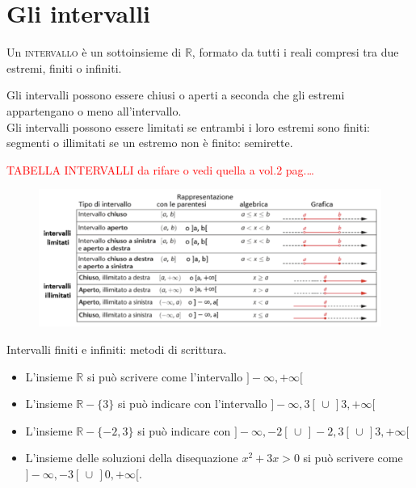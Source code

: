 \section{Gli intervalli}
  \begin{definizione}
Un \textsc{intervallo} è un sottoinsieme di $\mathbb{R}$, formato da tutti i 
reali compresi tra due estremi, finiti o infiniti.\\
\end{definizione}

Gli intervalli possono essere chiusi o aperti a seconda che gli estremi 
appartengano o meno all'intervallo.\\
Gli intervalli possono essere limitati se entrambi i loro estremi sono 
finiti: segmenti o illimitati se un estremo non è finito: semirette.

\textcolor{red}{TABELLA INTERVALLI da rifare o vedi quella a vol.2 pag.\dots}
\begin{figure}[htpb!]
  \centering
  \includegraphics[width=1\textwidth]{img/top_tab.png}%
\end{figure}




\begin{esempio} Intervalli finiti e infiniti: metodi di scrittura.
  \begin{itemize}
  \item[a)] L'insieme $\mathbb{R}$ si può scrivere come 
l'intervallo $]-\infty, +\infty[$\\
  \item[b)] L'insieme $\mathbb{R}-\{3\}$ si può indicare con 
l'intervallo $]-\infty, 3[\,\cup\,]3,+\infty[$\\
  \item[c)] L'insieme $\mathbb{R}-\{-2,3\}$ si può indicare con 
$]-\infty, -2[\,\cup\,]-2,3[\,\cup\,]3,+\infty[$\\
  \item[d)] L'insieme delle soluzioni della disequazione 
$x^2+3x>0$ si può scrivere come $]-\infty,-3[\,\cup\,]0,+\infty[$.\\
  \end{itemize}
\end{esempio}
  
